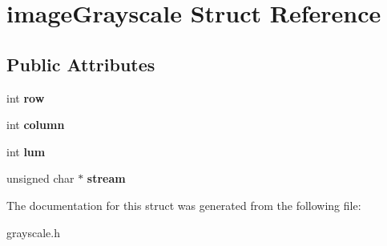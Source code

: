\hypertarget{structimageGrayscale}{}\section{image\+Grayscale Struct Reference}
\label{structimageGrayscale}
\subsection*{Public Attributes}
\begin{DoxyCompactItemize}
\item 
\mbox{\label{structimageGrayscale_a125b73b5911a7b328f424871eeaebdb1}} 
int {\bfseries row}
\item 
\mbox{\label{structimageGrayscale_a363fe975e1455bec100cfcbf3ee4e763}} 
int {\bfseries column}
\item 
\mbox{\label{structimageGrayscale_a53a10ce465abdfadbc385acea367a8d3}} 
int {\bfseries lum}
\item 
\mbox{\label{structimageGrayscale_a5f426f6b341657e87c2ad6cc211a023a}} 
unsigned char $\ast$ {\bfseries stream}
\end{DoxyCompactItemize}


The documentation for this struct was generated from the following file\+:\begin{DoxyCompactItemize}
\item 
grayscale.\+h\end{DoxyCompactItemize}
